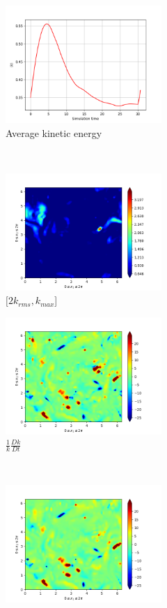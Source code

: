 \begin{figure}[H]
    \begin{subfigure}[H]{0.45\textwidth}
        \includegraphics[height=1.75in]{media/run-cds-65/ke-average1380.png}
        \caption{Average kinetic energy}
    \end{subfigure}
    ~
    \begin{subfigure}[H]{0.45\textwidth}
        \includegraphics[height=1.75in]{media/run-cds-65/ke-2-1380.png}
        \caption{$[2k_{rms}, k_{max} $] }
    \end{subfigure}
    \newline
    \begin{subfigure}[H]{0.45\textwidth}
        \includegraphics[height=1.75in]{media/run-cds-65/ke-1380.png}
        \caption{$\frac{1}{k} \frac{D k}{Dt}$}
    \end{subfigure}
    ~
    \begin{subfigure}{0.45\textwidth}
        \includegraphics[height=1.75in]{media/run-cds-65/A-ke-1380.png}

\end{subfigure}
\end{figure}
